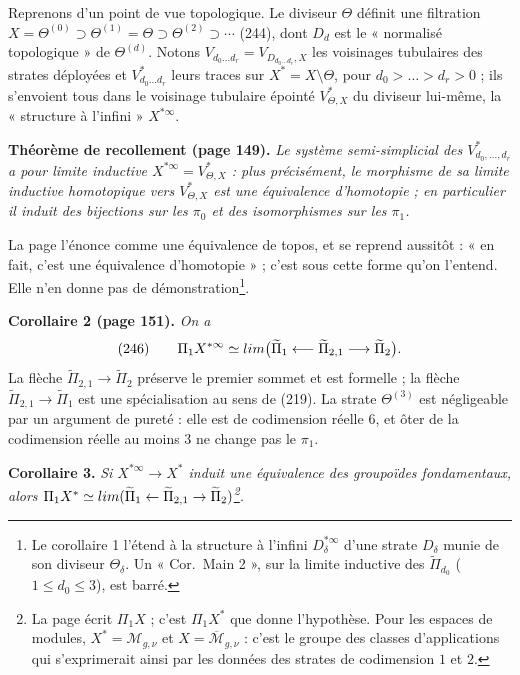 \documentclass[11pt,a4paper]{article}
\begin{document}
Reprenons d'un point de vue topologique. Le diviseur $\Theta$ définit une
filtration $X = \Theta^{(0)} \supset \Theta^{(1)} = \Theta \supset \Theta^{(2)}
\supset \cdots$ (244), dont $D_d$ est le « normalisé topologique » de
$\Theta^{(d)}$. Notons $V_{d_0 \dots d_r} = V_{D_{d_0 \dots d_r}, X}$ les voisinages
tubulaires des strates déployées et $V^{*}_{d_0 \dots d_r}$ leurs traces sur $X^* =
X \setminus \Theta$, pour $d_0 > \dots > d_r > 0$ ; ils s'envoient tous dans le
voisinage tubulaire épointé $V^{*}_{\Theta,X}$ du diviseur lui-même, la
« structure à l'infini » $X^{*\infty}$.

\textbf{Théorème de recollement (page 149).} \emph{Le système semi-simplicial des
$V^{*}_{d_0, \dots, d_r}$ a pour limite inductive $X^{*\infty} =
V^{*}_{\Theta,X}$ : plus précisément, le morphisme de sa limite inductive homotopique
vers $V^{*}_{\Theta,X}$ est une équivalence d'homotopie ; en particulier il induit
des bijections sur les $\pi_0$ et des isomorphismes sur les $\pi_1$.}

La page l'énonce comme une équivalence de topos, et se reprend aussitôt : « en
fait, c'est une équivalence d'homotopie » ; c'est sous cette forme qu'on
l'entend. Elle n'en donne pas de démonstration\footnote{Le corollaire 1 l'étend à
la structure à l'infini $D^{*\infty}_\delta$ d'une strate $D_\delta$ munie de son
diviseur $\Theta_\delta$. Un « Cor.\ Main 2 », sur la limite inductive des
$\widetilde{\Pi}_{d_0}$ ($1 \leq d_0 \leq 3$), est barré.}.

\textbf{Corollaire 2 (page 151).} \emph{On a}
\[
(246) \qquad \Pi_1 X^{*\infty} \simeq \varinjlim\bigl(\widetilde{\Pi}_1
\longleftarrow \widetilde{\Pi}_{2,1} \longrightarrow \widetilde{\Pi}_2\bigr) .
\]
La flèche $\widetilde{\Pi}_{2,1} \to \widetilde{\Pi}_2$ préserve le premier sommet
et est formelle ; la flèche $\widetilde{\Pi}_{2,1} \to \widetilde{\Pi}_1$ est une
spécialisation au sens de (219). La strate $\Theta^{(3)}$ est négligeable par un
argument de pureté : elle est de codimension réelle $6$, et ôter de la
codimension réelle au moins $3$ ne change pas le $\pi_1$.

\textbf{Corollaire 3.} \emph{Si $X^{*\infty} \to X^*$ induit une équivalence des
groupoïdes fondamentaux, alors $\Pi_1 X^* \simeq \varinjlim(\widetilde{\Pi}_1
\leftarrow \widetilde{\Pi}_{2,1} \rightarrow \widetilde{\Pi}_2)$\footnote{La page
écrit $\Pi_1 X$ ; c'est $\Pi_1 X^*$ que donne l'hypothèse. Pour les espaces de
modules, $X^* = \mathcal{M}_{g,\nu}$ et $X = \overline{\mathcal{M}}_{g,\nu}$ : c'est
le groupe des classes d'applications qui s'exprimerait ainsi par les données des
strates de codimension $1$ et $2$.}.}
\end{document}
